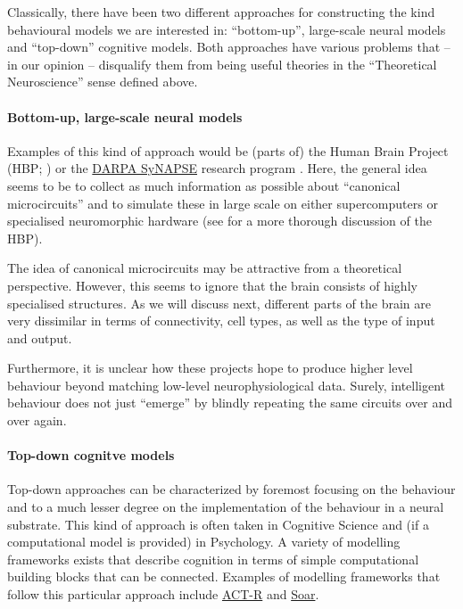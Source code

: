 \documentclass[10pt,letterpaper,oneside]{article}
\begin{document}
Classically, there have been two different approaches for constructing the kind behavioural models we are interested in: \enquote{bottom-up}, large-scale neural models and \enquote{top-down} cognitive models. Both approaches have various problems that -- in our opinion -- disqualify them from being useful theories in the \enquote{Theoretical Neuroscience} sense defined above.


\paragraph{Bottom-up, large-scale neural models}
Examples of this kind of approach would be (parts of) the Human Brain Project (HBP; \cite{markram2012human}) or the \href{https://www.darpa.mil/program/systems-of-neuromorphic-adaptive-plastic-scalable-electronics}{DARPA SyNAPSE} research program \cite{morgan2011darpa,merolla2014million}. Here, the general idea seems to be to collect as much information as possible about \enquote{canonical microcircuits} and to simulate these in large scale on either supercomputers or specialised neuromorphic hardware (see \cite{komer2016unified} for a more thorough discussion of the HBP).

The idea of canonical microcircuits may be attractive from a theoretical perspective. However, this seems to ignore that the brain consists of highly specialised structures. As we will discuss next, different parts of the brain are very dissimilar in terms of connectivity, cell types, as well as the type of input and output.

Furthermore, it is unclear how these projects hope to produce higher level behaviour beyond matching low-level neurophysiological data. Surely, intelligent behaviour does not just \enquote{emerge} by blindly repeating the same circuits over and over again.

\paragraph{Top-down cognitve models}
Top-down approaches can be characterized by foremost focusing on the behaviour and to a much lesser degree on the implementation of the behaviour in a neural substrate. This kind of approach is often taken in Cognitive Science and (if a computational model is provided) in Psychology. A variety of modelling frameworks exists that describe cognition in terms of simple computational building blocks that can be connected. Examples of modelling frameworks that follow this particular approach include \href{http://act-r.psy.cmu.edu/}{ACT-R} and \href{https://soar.eecs.umich.edu/}{Soar}.
\end{document}
